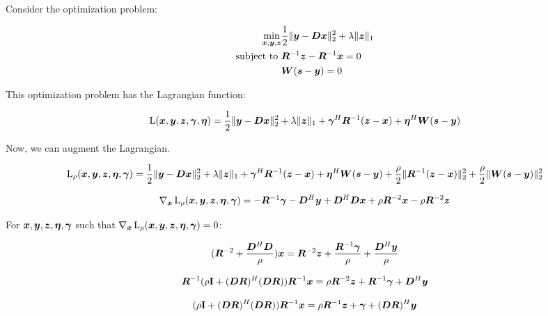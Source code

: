 \documentclass{article}
\begin{document}
Consider the optimization problem:

\begin{equation}
\begin{aligned}
\min_{\bm{x},\bm{y},\bm{z}} & \frac{1}{2}\|\bm{y} -\bm{D}\bm{x}\|_2^2 + \lambda\|\bm{z}\|_1 \\
\text{subject to } & \bm{R}^{-1}\bm{z} - \bm{R}^{-1}\bm{x} = 0 \\
                   &  \bm{W}(\bm{s} - \bm{y}) = 0
\end{aligned}
\end{equation}

This optimization problem has the Lagrangian function:

\begin{equation}
\operatorname{L}(\bm{x},\bm{y},\bm{z},\bm{\gamma},\bm{\eta}) = \frac{1}{2}\|\bm{y} - \bm{D}\bm{x}\|_2^2 + \lambda\|\bm{z}\|_1 + \bm{\gamma}^H\bm{R}^{-1}(\bm{z} - \bm{x}) + \bm{\eta}^H\bm{W}(\bm{s} - \bm{y})
\end{equation}

Now, we can augment the Lagrangian.

\begin{equation}
\operatorname{L}_{\rho}(\bm{x},\bm{y},\bm{z},\bm{\eta},\bm{\gamma}) = \frac{1}{2}\|\bm{y} - \bm{D}\bm{x}\|_2^2 + \lambda\|\bm{z}\|_1 + \bm{\gamma}^H\bm{R}^{-1}(\bm{z} - \bm{x}) + \bm{\eta}^H\bm{W}(\bm{s} - \bm{y}) + \frac{\rho}{2}\|\bm{R}^{-1}(\bm{z} - \bm{x})\|_2^2 + \frac{\rho}{2}\|\bm{W}(\bm{s} - \bm{y})\|_2^2
\end{equation} 

\begin{equation}
\nabla_{\bm{x}}\operatorname{L}_{\rho}(\bm{x},\bm{y},\bm{z},\bm{\eta},\bm{\gamma}) = -\bm{R}^{-1}\bm{\gamma} - \bm{D}^H\bm{y} + \bm{D}^H\bm{D}\bm{x} + \rho\bm{R}^{-2}\bm{x} - \rho\bm{R}^{-2}\bm{z}
\end{equation}

For $\bm{x},\bm{y},\bm{z},\bm{\eta},\bm{\gamma}$ such that $\nabla_{\bm{x}}\operatorname{L}_{\rho}(\bm{x},\bm{y},\bm{z},\bm{\eta},\bm{\gamma}) = 0$:

\begin{equation}
(\bm{R}^{-2} + \frac{\bm{D}^H\bm{D}}{\rho})\bm{x} = \bm{R}^{-2}\bm{z} + \frac{\bm{R}^{-1} \bm{\gamma}}{\rho} + \frac{\bm{D}^H\bm{y}}{\rho}
\end{equation}

\begin{equation}
\bm{R}^{-1}(\rho{\bf I} + (\bm{D}\bm{R})^H(\bm{D}\bm{R}))\bm{R}^{-1}\bm{x} = \rho\bm{R}^{-2}\bm{z} + \bm{R}^{-1}\bm{\gamma} + \bm{D}^H\bm{y}
\end{equation}

\begin{equation}
(\rho{\bf I} + (\bm{D}\bm{R})^H(\bm{D}\bm{R}))\bm{R}^{-1}\bm{x} = \rho\bm{R}^{-1}\bm{z} + \bm{\gamma} + (\bm{D}\bm{R})^H\bm{y}
\end{equation}
\end{document}
